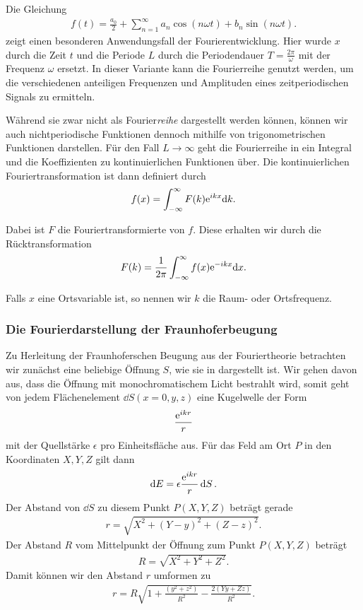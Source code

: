 Die Gleichung
\begin{align}
  f(t) = \frac{a_0}{2} + \sum_{n=1}^{\infty} a_n \cos(n\omega t) + b_n \sin(n\omega t).
\end{align}
zeigt einen besonderen Anwendungsfall der Fourierentwicklung. Hier wurde $x$ durch die Zeit $t$ und die Periode $L$ durch die Periodendauer $T = \frac{2\pi}{\omega}$ mit der Frequenz $\omega$ ersetzt. In dieser Variante kann die Fourierreihe genutzt werden, um die verschiedenen anteiligen Frequenzen und Amplituden eines zeitperiodischen Signals zu ermitteln.

Während sie zwar nicht als Fourier\textit{reihe} dargestellt werden können, können wir auch nichtperiodische Funktionen dennoch mithilfe von trigonometrischen Funktionen darstellen. Für den Fall $L\to\infty$ geht die Fourierreihe in ein Integral und die Koeffizienten zu kontinuierlichen Funktionen über. Die kontinuierlichen Fouriertransformation ist dann definiert durch
\begin{align}
  f(x) = \int_{-\infty}^{\infty} F(k) \text{e}^{ikx} \dd k.
\end{align}

Dabei ist $F$ die Fouriertransformierte von $f$. Diese erhalten wir durch die Rücktransformation
\begin{align}
  F(k) = \frac{1}{2\pi} \int_{-\infty}^{\infty} f(x) \text{e}^{-ikx} \dd x.
\end{align}

Falls $x$ eine Ortsvariable ist, so nennen wir $k$ die Raum- oder Ortsfrequenz.

\subsubsection*{Die Fourierdarstellung der Fraunhoferbeugung}

Zu Herleitung der Fraunhoferschen Beugung aus der Fouriertheorie betrachten wir zunächst eine beliebige Öffnung $S$, wie sie in  dargestellt ist. Wir gehen davon aus, dass die Öffnung mit monochromatischem Licht bestrahlt wird, somit geht von jedem Flächenelement $\dd{S}(x = 0, y, z)$ eine Kugelwelle der Form 
\begin{align}
  \frac{\text{e}^{ikr}}{r}
\end{align}
mit der Quellstärke $\epsilon$ pro Einheitsfläche aus. Für das Feld am Ort $P$ in den Koordinaten $X,Y,Z$ gilt dann
\begin{align}
  \dd{E} = \epsilon \frac{\text{e}^{ikr}}{r} \dd{S}. \label{eq:dE_bei_P}
\end{align}
Der Abstand von $\dd{S}$ zu diesem Punkt $P(X,Y,Z)$ beträgt gerade
\begin{align}
  r = \sqrt{X^2 + (Y - y)^2 + (Z - z)^2}.
\end{align}
Der Abstand $R$ vom Mittelpunkt der Öffnung zum Punkt $P(X,Y,Z)$ beträgt
\begin{align}
  R = \sqrt{X^2 + Y^2 + Z^2}.
\end{align}
Damit können wir den Abstand $r$ umformen zu
\begin{align}
  r = R\sqrt{1 + \frac{(y^2 + z^2)}{R^2} - \frac{2 (Yy + Zz)}{R^2}}.
\end{align}

